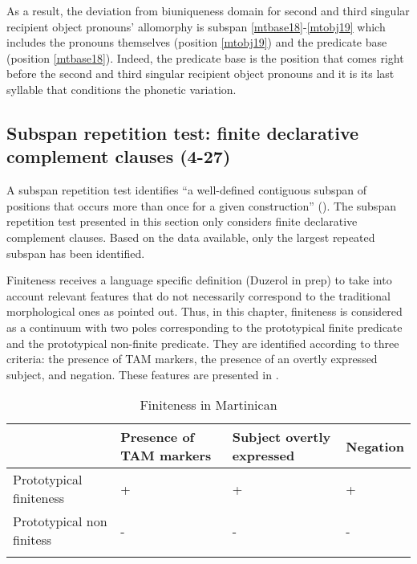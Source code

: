 \documentclass[output=paper]{langscibook}
\begin{document}
As a result, the deviation from biuniqueness domain for second and third singular recipient object pronouns' allomorphy is subspan \ref{mtbase18}-\ref{mtobj19} which includes the pronouns themselves (position \ref{mtobj19}) and the predicate base (position \ref{mtbase18}). Indeed, the predicate base is the position that comes right before the second and third singular recipient object pronouns and it is its last syllable that conditions the phonetic variation.

\subsection{Subspan repetition test: finite declarative complement clauses (4-27)}

A subspan repetition test identifies ``a well-defined contiguous subspan of positions that occurs more than once for a given construction'' (\citealt[16]{tallman2021constituency}). The subspan repetition test presented in this section only considers finite declarative complement clauses. Based on the data available, only the largest repeated subspan has been identified.

Finiteness receives a language specific definition (Duzerol in prep) to take into account relevant features that do not necessarily correspond to the traditional morphological ones as \citet{Migge2018} pointed out. Thus, in this chapter, finiteness is considered as a continuum with two poles corresponding to the prototypical finite predicate and the prototypical non-finite predicate. They are identified according to three criteria: the presence of TAM markers, the presence of an overtly expressed subject, and negation. These features are presented in .

\begin{table}
    \centering
    \caption{Finiteness in Martinican \citep[3]{Duzerol2021b}}
    \label{tab:mart:key:4}
    \begin{tabularx}{\textwidth}{lQQl}
        \lsptoprule
        & Presence of TAM markers & Subject overtly expressed & Negation\\ \midrule
         Prototypical finiteness & + & + & +\\
         Prototypical non finitess & - & - & -\\
    \lspbottomrule
    \end{tabularx}
\end{table}
\end{document}
